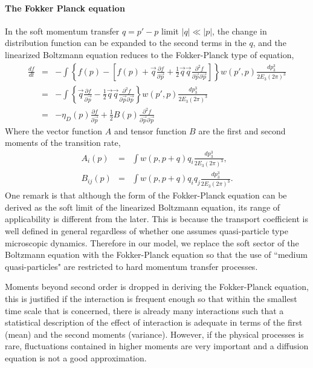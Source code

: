 \paragraph{The Fokker Planck equation}
In the soft momentum transfer $q = p'-p$ limit  $|q| \ll |p|$, the change in distribution function can be expanded to the second terms in the $q$, and the linearized Boltzmann equation reduces to the Fokker-Planck type of equation,
\begin{eqnarray}
\frac{df}{dt} &=& - \int \left\{
f(p) - \left[f(p) +  \vec{q}\frac{\partial f}{\partial\vec{p}} + \frac{1}{2}\vec{q}\vec{q}\frac{\partial^2 f}{\partial\vec{p} \partial\vec{p}} \right]
\right\} w(p',p)\frac{dp_3^3}{2E_3 (2\pi)^3} \\
&=& - \int \left\{ \vec{q}\frac{\partial f}{\partial\vec{p}} - \frac{1}{2}\vec{q}\vec{q}\frac{\partial^2 f}{\partial\vec{p} \partial\vec{p}}
\right\} w(p',p)\frac{dp_3^3}{2E_3 (2\pi)^3} \\
&=&  -\eta_D(p) \frac{\partial f}{\partial\vec{p}} + \frac{1}{2}B(p)\frac{\partial^2 f}{\partial\vec{p} \partial\vec{p}}
\end{eqnarray}
Where the vector function $A$ and tensor function $B$ are the first and second moments of the transition rate,
\begin{eqnarray}
A_i(p) &=& \int w(p,p+q) q_i \frac{dp_3^3}{2E_3 (2\pi)^3},\\
B_{ij}(p) &=& \int w(p,p+q) q_i q_j \frac{dp_3^3}{2E_3 (2\pi)^3}.
\end{eqnarray}
One remark is that although the form of the Fokker-Planck equation can be derived as the soft limit of the linearized Boltzmann equation, its range of applicability is different from the later.
This is because the transport coefficient is well defined in general regardless of whether one assumes quasi-particle type microscopic dynamics.
Therefore in our model, we replace the soft sector of the Boltzmann equation with the Fokker-Planck equation so that the use of ``medium quasi-particles" are restricted to hard momentum transfer processes.

Moments beyond second order is dropped in deriving the Fokker-Planck equation, this is justified if the interaction is frequent enough so that within the smallest time scale that is concerned, there is already many interactions such that a statistical description of the effect of interaction is adequate in terms of the first (mean) and the second moments (variance).
However, if the physical processes is rare, fluctuations contained in higher moments are very important and a diffusion equation is not a good approximation.

